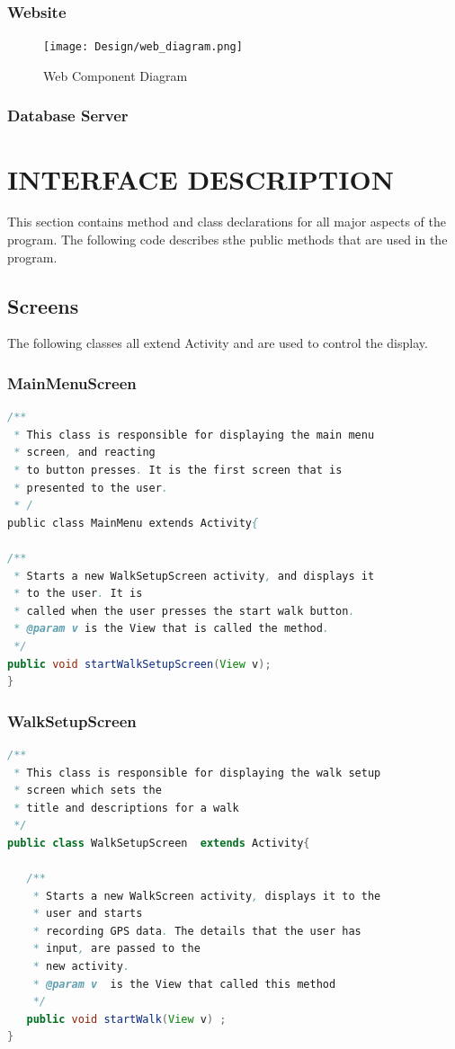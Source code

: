 \documentclass[12pt]{article}
\begin{document}
\subsubsection{Website}
\clearpage
\begin{figure}[htp]

\centering
\texttt{[image: Design/web\_diagram.png]}
\caption{Web Component Diagram}
\label{Web Component Diagram}
\end{figure}
\subsubsection{Database Server}
\section{INTERFACE DESCRIPTION}
This section contains method and class declarations for all major aspects of the program. The following code describes sthe public methods that are used in the program.
\subsection{Screens}
The following classes all extend Activity and are used to control the display.

\subsubsection{MainMenuScreen}
\begin{lstlisting}[language=java]
/**
 * This class is responsible for displaying the main menu 
 * screen, and reacting
 * to button presses. It is the first screen that is 
 * presented to the user.
 * /
public class MainMenu extends Activity{

/**
 * Starts a new WalkSetupScreen activity, and displays it
 * to the user. It is
 * called when the user presses the start walk button.
 * @param v is the View that is called the method.
 */
public void startWalkSetupScreen(View v);
}
\end{lstlisting}
\subsubsection{WalkSetupScreen}
\begin{lstlisting}[language=java]
/**
 * This class is responsible for displaying the walk setup
 * screen which sets the
 * title and descriptions for a walk
 */
public class WalkSetupScreen  extends Activity{

   /**
    * Starts a new WalkScreen activity, displays it to the 
    * user and starts
    * recording GPS data. The details that the user has 
    * input, are passed to the
    * new activity.
    * @param v  is the View that called this method
    */
   public void startWalk(View v) ;
}
\end{lstlisting}
\end{document}
